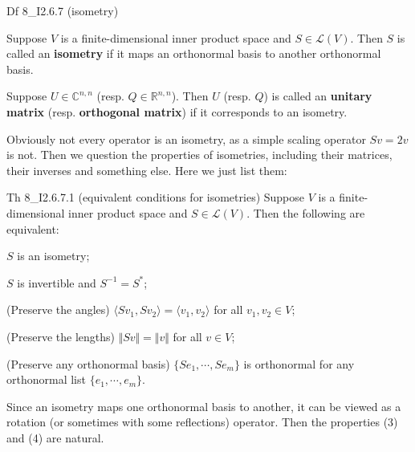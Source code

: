 \documentclass{article}
\begin{document}
\begin{Df}{Df 8\_I2.6.7 (isometry)}
    \begin{compactenum}
        \item Suppose $V$ is a finite-dimensional inner product space and $S\in\mathcal{L}(V)$. Then $S$ is called an \textbf{isometry} if it maps an orthonormal basis to another orthonormal basis. 
        \item Suppose $U\in\mathbb{C}^{n,n}$ (resp. $Q\in\mathbb{R}^{n,n}$). Then $U$ (resp. $Q$) is called an \textbf{unitary matrix} (resp. \textbf{orthogonal matrix}) if it corresponds to an isometry.
    \end{compactenum}
\end{Df}

\textcolor{Df}{Obviously not every operator is an isometry}, as a simple scaling operator $Sv = 2v$ is not. Then we question the properties of isometries, including their matrices, their inverses and something else. Here we just list them:

\begin{Th}{Th 8\_I2.6.7.1 (equivalent conditions for isometries)}
    Suppose $V$ is a finite-dimensional inner product space and $S\in\mathcal{L}(V)$. Then the following are equivalent:
    \begin{compactenum}
        \item $S$ is an isometry;
        \item $S$ is invertible and $S^{-1} = S^\ast$;
        \item (Preserve the angles) $\langle Sv_1, Sv_2\rangle = \langle v_1, v_2\rangle$ for all $v_1, v_2\in V$;
        \item (Preserve the lengths) $\Vert Sv\Vert = \Vert v\Vert$ for all $v\in V$;
        \item (Preserve any orthonormal basis) $\{Se_1,\cdots,Se_m\}$ is orthonormal for any orthonormal list $\{e_1,\cdots,e_m\}$.
    \end{compactenum}
\end{Th}

Since an isometry maps one orthonormal basis to another, it can be viewed as a rotation (or sometimes with some reflections) operator. Then the properties (3) and (4) are natural. 
\end{document}
